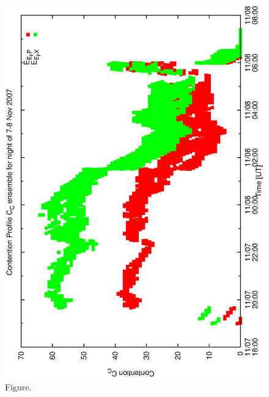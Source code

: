 \documentclass[12pt,a4paper]{article}
\begin{document}
\clearpage
\begin{figure}[htbp]
 \begin{center}
  \includegraphics[scale=1.0, angle=0]{figures/cont4_ensemble.eps}
 \end{center}
  \caption[Figure.]
{Figure.}
\end{figure}
\clearpage
\end{document}
